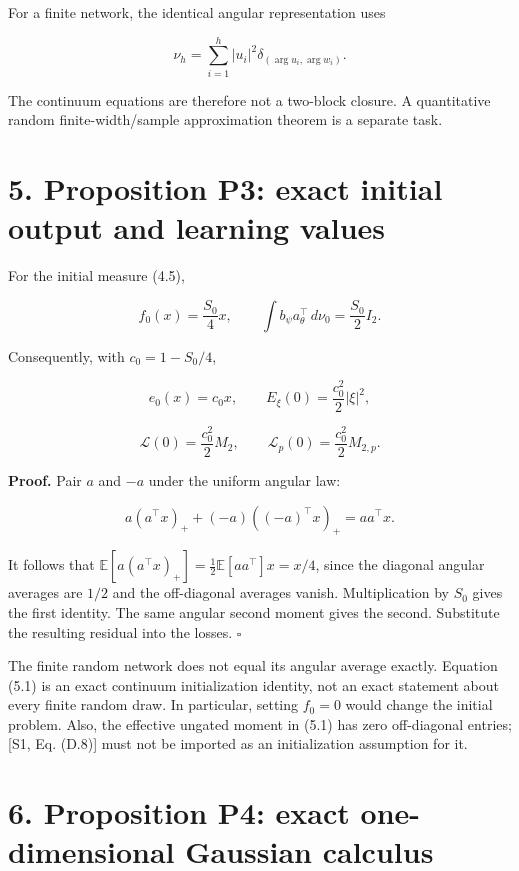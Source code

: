 \documentclass[
  10pt,
]{article}
\begin{document}
For a finite network, the identical angular representation uses

\[
 \nu_h=\sum_{i=1}^h |u_i|^2\delta_{(\arg u_i,\arg w_i)}.
\]

The continuum equations are therefore not a two-block closure. A
quantitative random finite-width/sample approximation theorem is a
separate task.

\section{5. Proposition P3: exact initial output and learning
values}\label{proposition-p3-exact-initial-output-and-learning-values}

For the initial measure (4.5),

\[
 f_0(x)=\frac{S_0}{4}x,\qquad
 \int b_\psi a_\theta^\top\,d\nu_0=\frac{S_0}{2}I_2.
 \tag{5.1}
\]

Consequently, with \(c_0=1-S_0/4\),

\[
 e_0(x)=c_0x,\qquad
 E_\xi(0)=\frac{c_0^2}{2}|\xi|^2,
\]

\[
 \mathcal L(0)=\frac{c_0^2}{2}M_2,\qquad
 \mathcal L_p(0)=\frac{c_0^2}{2}M_{2,p}.
 \tag{5.2}
\]

\textbf{Proof.} Pair \(a\) and \(-a\) under the uniform angular law:

\[
 a(a^\top x)_++(-a)((-a)^\top x)_+=aa^\top x.
\]

It follows that
\(\mathbb E[a(a^\top x)_+]=\frac12\mathbb E[aa^\top]x=x/4\), since the
diagonal angular averages are \(1/2\) and the off-diagonal averages
vanish. Multiplication by \(S_0\) gives the first identity. The same
angular second moment gives the second. Substitute the resulting
residual into the losses. \(\square\)

The finite random network does not equal its angular average exactly.
Equation (5.1) is an exact continuum initialization identity, not an
exact statement about every finite random draw. In particular, setting
\(f_0=0\) would change the initial problem. Also, the effective ungated
moment in (5.1) has zero off-diagonal entries; {[}S1, Eq. (D.8){]} must
not be imported as an initialization assumption for it.

\section{6. Proposition P4: exact one-dimensional Gaussian
calculus}\label{proposition-p4-exact-one-dimensional-gaussian-calculus}
\end{document}
